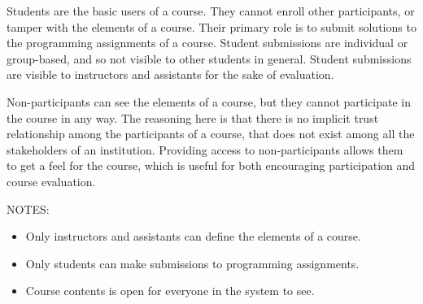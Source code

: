 Students are the basic users of a course. They cannot enroll other
participants, or tamper with the elements of a course. Their primary role is to
submit solutions to the programming assignments of a course. Student
submissions are individual or group-based, and so not visible to other students
in general. Student submissions are visible to instructors and assistants for
the sake of evaluation.

Non-participants can see the elements of a course, but they cannot participate
in the course in any way. The reasoning here is that there is no implicit trust
relationship among the participants of a course, that does not exist among all
the stakeholders of an institution. Providing access to non-participants allows
them to get a feel for the course, which is useful for both encouraging
participation and course evaluation.

NOTES:

\begin{itemize}

\item Only instructors and assistants can define the elements of a course.

\item Only students can make submissions to programming assignments.

\item Course contents is open for everyone in the system to see.

\end{itemize}




